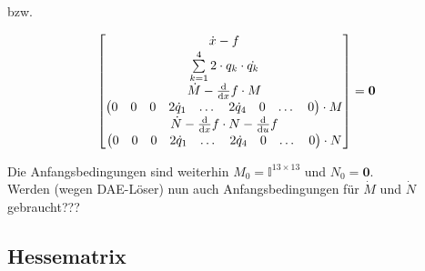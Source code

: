 \documentclass[12pt, a4paper]{scrartcl}
\begin{document}
bzw.

\[
	 \begin{bmatrix} \dot{x} - f \vspace{.2ex} \\
									 \sum\limits_{k=1}^4{2\cdot q_k \cdot \dot{q_k}} \vspace{.2ex} \\
									 \dot{M} - \frac{\textup{d}}{\textup{d}x} f \cdot M \vspace{.2ex} \\
									 \begin{pmatrix} 0 & 0 & 0 & 2\dot{q}_1 & \dots & 2\dot{q}_4 & 0 & \dots & 0 \end{pmatrix} \cdot M \vspace{.2ex} \\
									 \dot{N} - \frac{\textup{d}}{\textup{d}x} f \cdot N - \frac{\textup{d}}{\textup{d}u} f \vspace{.2ex} \\
									 \begin{pmatrix} 0 & 0 & 0 & 2\dot{q}_1 & \dots & 2\dot{q}_4 & 0 & \dots & 0 \end{pmatrix} \cdot N
	 \end{bmatrix}
		= \textbf{0}
\]

Die Anfangsbedingungen sind weiterhin \(M_0 = \mathbb{I}^{13\times13}\) und \(N_0 = \textbf{0}\). \\
Werden (wegen DAE-Löser) nun auch Anfangsbedingungen für \(\dot{M}\) und \(\dot{N}\) gebraucht???


\subsection*{Hessematrix}
\end{document}
